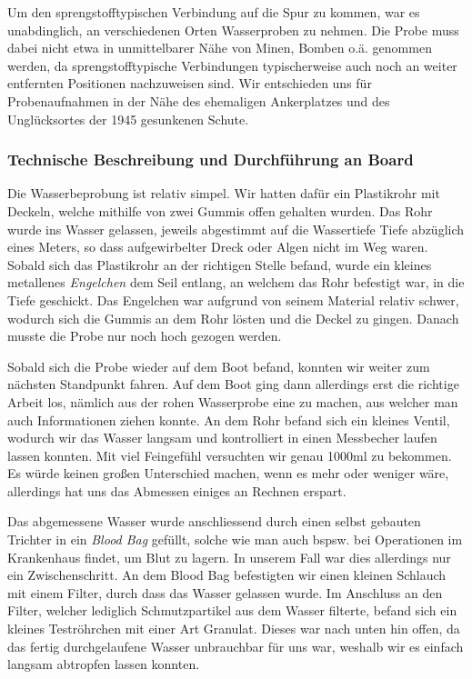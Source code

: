  

Um den sprengstofftypischen Verbindung auf die Spur zu kommen, war es unabdinglich, an verschiedenen Orten Wasserproben zu nehmen. Die Probe muss dabei nicht etwa in unmittelbarer Nähe von Minen, Bomben o.ä. genommen werden, da sprengstofftypische Verbindungen typischerweise auch noch an weiter entfernten Positionen nachzuweisen sind. Wir entschieden uns für Probenaufnahmen in der Nähe des ehemaligen Ankerplatzes und des Unglücksortes der 1945 gesunkenen Schute.

\subsubsection{Technische Beschreibung und Durchführung an Board}
Die Wasserbeprobung ist relativ simpel. Wir hatten dafür ein Plastikrohr mit Deckeln, welche mithilfe von zwei Gummis offen gehalten wurden. Das Rohr wurde ins Wasser gelassen, jeweils abgestimmt auf die Wassertiefe Tiefe abzüglich eines Meters, so dass aufgewirbelter Dreck oder Algen nicht im Weg waren. Sobald sich das Plastikrohr an der richtigen Stelle befand, wurde ein kleines metallenes \emph{Engelchen} dem Seil entlang, an welchem das Rohr befestigt war, in die Tiefe geschickt. Das Engelchen war aufgrund von seinem Material relativ schwer, wodurch sich die Gummis an dem Rohr lösten und die Deckel zu gingen. Danach musste die Probe nur noch hoch gezogen werden.

Sobald sich die Probe wieder auf dem Boot befand, konnten wir weiter zum nächsten Standpunkt fahren. Auf dem Boot ging dann allerdings erst die richtige Arbeit los, nämlich aus der rohen Wasserprobe eine zu machen, aus welcher man auch Informationen ziehen konnte. An dem Rohr befand sich ein kleines Ventil, wodurch wir das Wasser langsam und kontrolliert in einen Messbecher laufen lassen konnten. Mit viel Feingefühl versuchten wir genau 1000ml zu bekommen. Es würde keinen großen Unterschied machen, wenn es mehr oder weniger wäre, allerdings hat uns das Abmessen einiges an Rechnen erspart. 

Das abgemessene Wasser wurde anschliessend durch einen selbst gebauten Trichter in ein \emph{Blood Bag} gefüllt, solche wie man auch bspsw. bei Operationen im Krankenhaus findet, um Blut zu lagern. In unserem Fall war dies allerdings nur ein Zwischenschritt. 
An dem Blood Bag befestigten wir einen kleinen Schlauch mit einem Filter, durch dass das Wasser gelassen wurde. Im Anschluss an den Filter, welcher lediglich Schmutzpartikel aus dem Wasser filterte, befand sich ein kleines Teströhrchen mit einer Art Granulat. Dieses war nach unten hin offen, da das fertig durchgelaufene Wasser unbrauchbar für uns war, weshalb wir es einfach langsam abtropfen lassen konnten.

